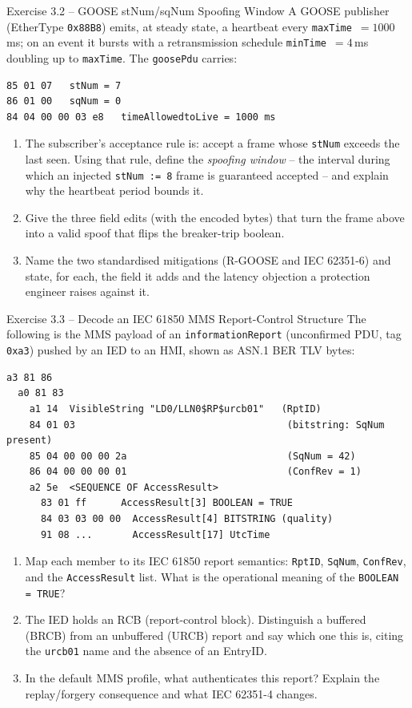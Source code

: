 \documentclass[11pt,a4paper]{article}
\begin{document}
\begin{taskbox}{Exercise 3.2 -- GOOSE stNum/sqNum Spoofing Window}
A GOOSE publisher (EtherType \texttt{0x88B8}) emits, at steady state, a
heartbeat every \texttt{maxTime}~$=1000$\,ms; on an event it bursts with a
retransmission schedule \texttt{minTime}~$=4$\,ms doubling up to
\texttt{maxTime}. The \texttt{goosePdu} carries:
\begin{lstlisting}[language={}]
85 01 07   stNum = 7
86 01 00   sqNum = 0
84 04 00 00 03 e8   timeAllowedtoLive = 1000 ms
\end{lstlisting}
\begin{enumerate}
  \item The subscriber's acceptance rule is: accept a frame whose
        \texttt{stNum} exceeds the last seen. Using that rule, define the
        \emph{spoofing window} -- the interval during which an injected
        \texttt{stNum := 8} frame is guaranteed accepted -- and explain why
        the heartbeat period bounds it.
  \item Give the three field edits (with the encoded bytes) that turn the
        frame above into a valid spoof that flips the breaker-trip boolean.
  \item Name the two standardised mitigations (R-GOOSE and IEC 62351-6) and
        state, for each, the field it adds and the latency objection a
        protection engineer raises against it.
\end{enumerate}
\end{taskbox}

\begin{taskbox}{Exercise 3.3 -- Decode an IEC 61850 MMS Report-Control Structure}
The following is the MMS payload of an \texttt{informationReport}
(unconfirmed PDU, tag \texttt{0xa3}) pushed by an IED to an HMI, shown as
ASN.1 BER TLV bytes:
\begin{lstlisting}[language={}]
a3 81 86
  a0 81 83
    a1 14  VisibleString "LD0/LLN0$RP$urcb01"   (RptID)
    84 01 03                                     (bitstring: SqNum present)
    85 04 00 00 00 2a                            (SqNum = 42)
    86 04 00 00 00 01                            (ConfRev = 1)
    a2 5e  <SEQUENCE OF AccessResult>
      83 01 ff      AccessResult[3] BOOLEAN = TRUE
      84 03 03 00 00  AccessResult[4] BITSTRING (quality)
      91 08 ...       AccessResult[17] UtcTime
\end{lstlisting}
\begin{enumerate}
  \item Map each member to its IEC 61850 report semantics: \texttt{RptID},
        \texttt{SqNum}, \texttt{ConfRev}, and the \texttt{AccessResult}
        list. What is the operational meaning of the \texttt{BOOLEAN = TRUE}?
  \item The IED holds an RCB (report-control block). Distinguish a buffered
        (BRCB) from an unbuffered (URCB) report and say which one this is,
        citing the \texttt{urcb01} name and the absence of an EntryID.
  \item In the default MMS profile, what authenticates this report? Explain
        the replay/forgery consequence and what IEC 62351-4 changes.
\end{enumerate}
\end{taskbox}
\end{document}
